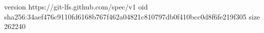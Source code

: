 version https://git-lfs.github.com/spec/v1
oid sha256:34aef476c9110fd6168b767f462a04821c810797db0f410bcc0d8f6fe219f305
size 262240
